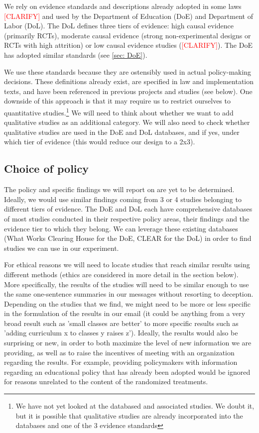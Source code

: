 \documentclass[12pt,final,fleqn]{article}
\theoremstyle{plain}
\begin{document}
We rely on evidence standards and descriptions already adopted in some laws \textcolor{red}{[CLARIFY]} and used by the Department of Education (DoE) and Department of Labor (DoL). The DoL defines three tiers of evidence: high causal evidence (primarily RCTs), moderate causal evidence (strong non-experimental designs or RCTs with high attrition) or low causal evidence studies (\textcolor{red}{[CLARIFY]}). The DoE has adopted similar standards (see \autoref{sec: DoE}). 

We use these standards because they are ostensibly used in actual policy-making decisions. These definitions already exist, are specified in law and implementation texts, and have been referenced in previous projects and studies (see below). One downside of this approach is that it may require us to restrict ourselves to quantitative studies.\footnote{We have not yet looked at the databased and associated studies. We doubt it, but it is possible that qualitative studies are already incorporated into the databases and one of the 3 evidence standards} We will need to think about whether we want to add qualitative studies as an additional category. We will also need to check whether qualitative studies are used in the DoE and DoL databases, and if yes, under which tier of evidence (this would reduce our design to a 2x3). 

\subsection{Choice of policy} \label{sec: Policy}

The policy and specific findings we will report on are yet to be determined. Ideally, we would use similar findings coming from 3 or 4 studies belonging to different tiers of evidence. The DoE and DoL each have comprehensive databases of most studies conducted in their respective policy areas, their findings and the evidence tier to which they belong. We can leverage these existing databases (What Works Clearing House for the DoE, CLEAR for the DoL) in order to find studies we can use in our experiment. 

For ethical reasons we will need to locate studies that reach similar results using different methods (ethics are considered in more detail in the  section below). More specifically, the results of the studies will need to be similar enough to use the same one-sentence summaries in our messages without resorting to deception. Depending on the studies that we find, we might need to be more or less specific in the formulation of the results in our email (it could be anything from a very broad result such as 'small classes are better' to more specific results such as 'adding curriculum x to classes y raises z'). Ideally, the results would also be surprising or new, in order to both maximize the level of new information we are providing, as well as to raise the incentives of meeting with an organization regarding the results. For example, providing policymakers with information regarding an educational policy that has already been adopted would be ignored for reasons unrelated to the content of the randomized treatments. 
\end{document}
